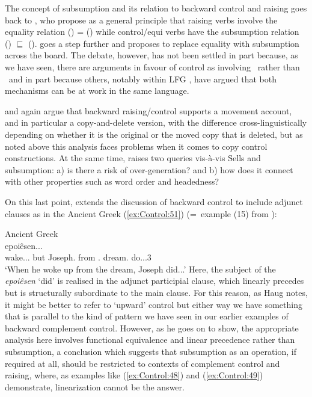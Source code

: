 \documentclass[output=paper,hidelinks]{langscibook}
\begin{document}
The concept of subsumption and its relation to backward control and raising goes back to \citet{ZaenenKaplan2002:Subsumption}, who propose as a general principle that raising verbs involve the equality relation (\UP\SUBJ) = (\UP\XCOMP\SUBJ) while control/equi verbs have the subsumption relation (\UP\SUBJ) $\sqsubseteq$ (\UP\XCOMP\SUBJ). \citet{sellssubsump} goes a step further and proposes to replace equality with subsumption across the board. The debate, however, has not been settled in part because, as we have seen, there are arguments in favour of control as involving \COMP\ rather than \XCOMP\ and in part because others, notably within LFG \citep{Arka2014}, have argued that both mechanisms can be at work in the same language.

\citet{polipots06} and again \citet{Polinsky2013} argue that backward raising/control supports a movement account, and in particular a copy-and-delete version, with the difference cross-linguistically depending on whether it is the original or the moved copy that is deleted, but as noted above this analysis faces problems when it comes to copy control constructions. At the same time, \citet{Polinsky2013} raises two queries vis-{\`a}-vis Sells and subsumption: a) is there a risk of over-generation? and b) how does it connect with other properties such as word order and headedness?

On this last point, \citet{Haug2011,Haug2017} extends the discussion of backward control to include adjunct clauses as in the Ancient Greek (\ref{ex:Control:51}) (=~example (15) from \citealt{Haug2011}):

\ea\label{ex:Control:51}Ancient Greek\\
 epoi{\^e}sen...\\
{wake.\PFV.\PTCP.\NOM}  but {Joseph.\NOM} from {\DEF.\GEN}  {dream.\GEN} do.\PST.\PFV.3\SG\\
\glt`When he woke up from the dream, Joseph did...'
\z
Here, the subject of the \emph{epoi{\^e}sen} `did' is realised in the adjunct participial clause, which linearly precedes but is structurally subordinate to the main clause. For this reason, as Haug notes, it might be better to refer to `upward' control but either way we have something that is parallel to the kind of pattern we have seen in our earlier examples of backward complement control. However, as he goes on to show, the appropriate analysis here involves functional equivalence and linear precedence rather than subsumption, a conclusion which suggests that subsumption as an operation, if required at all, should be restricted to contexts of complement control and raising, where, as examples like (\ref{ex:Control:48}) and (\ref{ex:Control:49}) demonstrate, linearization cannot be the answer.
\end{document}
